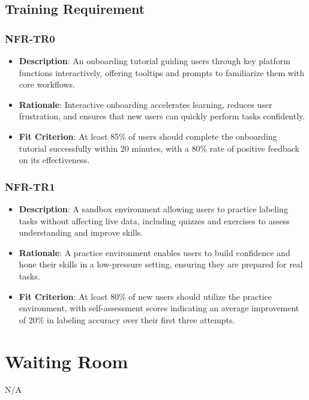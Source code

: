 \documentclass[12pt]{article}
\begin{document}
\subsection{Training Requirement}


\subsubsection*{NFR-TR0}
        \label{sec:TR0}
        \begin{itemize} 
            \item \textbf{Description}: An onboarding tutorial guiding users through key platform functions interactively, offering tooltips and prompts to familiarize them with core workflows.  
            \item \textbf{Rationale}: Interactive onboarding accelerates learning, reduces user frustration, and ensures that new users can quickly perform tasks confidently.  
            \item \textbf{Fit Criterion}: At least 85\% of users should complete the onboarding tutorial successfully within 20 minutes, with a 80\% rate of positive feedback on its effectiveness.
        \end{itemize}
        \subsubsection*{NFR-TR1}
        \label{sec:TR1}
        \begin{itemize} 
            \item \textbf{Description}: A sandbox environment allowing users to practice labeling tasks without affecting live data, including quizzes and exercises to assess understanding and improve skills.  
            \item \textbf{Rationale}: A practice environment enables users to build confidence and hone their skills in a low-pressure setting, ensuring they are prepared for real tasks.  
            \item \textbf{Fit Criterion}: At least 80\% of new users should utilize the practice environment, with self-assessment scores indicating an average improvement of 20\% in labeling accuracy over their first three attempts.
        \end{itemize}



\section{Waiting Room}
N/A
\end{document}
